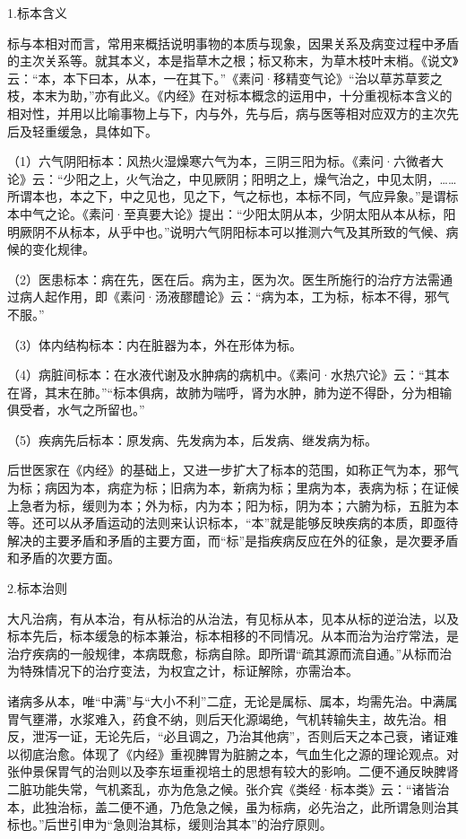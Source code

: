 \documentclass[draft,12pt]{ctexbook}
\begin{document}

1.标本含义

标与本相对而言，常用来概括说明事物的本质与现象，因果关系及病变过程中矛盾的主次关系等。就其本义，本是指草木之根；标又称末，为草木枝叶末梢。《说文》云：“本，本下曰本，从本，一在其下。”《素问·移精变气论》“治以草苏草荄之枝，本末为助，”亦有此义。《内经》在对标本概念的运用中，十分重视标本含义的相对性，并用以比喻事物上与下，内与外，先与后，病与医等相对应双方的主次先后及轻重缓急，具体如下。

（1）六气阴阳标本：风热火湿燥寒六气为本，三阴三阳为标。《素问·六微者大论》云：“少阳之上，火气治之，中见厥阴；阳明之上，燥气治之，中见太阴，……所谓本也，本之下，中之见也，见之下，气之标也，本标不同，气应异象。”是谓标本中气之论。《素问·至真要大论》提出：“少阳太阴从本，少阴太阳从本从标，阳明厥阴不从标本，从乎中也。”说明六气阴阳标本可以推测六气及其所致的气候、病候的变化规律。

（2）医患标本：病在先，医在后。病为主，医为次。医生所施行的治疗方法需通过病人起作用，即《素问·汤液醪醴论》云：“病为本，工为标，标本不得，邪气不服。”

（3）体内结构标本：内在脏器为本，外在形体为标。

（4）病脏间标本：在水液代谢及水肿病的病机中。《素问·水热穴论》云：“其本在肾，其末在肺。”“标本俱病，故肺为喘呼，肾为水肿，肺为逆不得卧，分为相输俱受者，水气之所留也。”

（5）疾病先后标本：原发病、先发病为本，后发病、继发病为标。

后世医家在《内经》的基础上，又进一步扩大了标本的范围，如称正气为本，邪气为标；病因为本，病症为标；旧病为本，新病为标；里病为本，表病为标；在证候上急者为标，缓则为本；外为标，内为本；阳为标，阴为本；六腑为标，五脏为本等。还可以从矛盾运动的法则来认识标本，“本”就是能够反映疾病的本质，即亟待解决的主要矛盾和矛盾的主要方面，而“标”是指疾病反应在外的征象，是次要矛盾和矛盾的次要方面。

2.标本治则

大凡治病，有从本治，有从标治的从治法，有见标从本，见本从标的逆治法，以及标本先后，标本缓急的标本兼治，标本相移的不同情况。从本而治为治疗常法，是治疗疾病的一般规律，本病既愈，标病自除。即所谓“疏其源而流自通。”从标而治为特殊情况下的治疗变法，为权宜之计，标证解除，亦需治本。

诸病多从本，唯“中满”与“大小不利”二症，无论是属标、属本，均需先治。中满属胃气壅滞，水浆难入，药食不纳，则后天化源竭绝，气机转输失主，故先治。相反，泄泻一证，无论先后，“必且调之，乃治其他病”，否则后天之本己衰，诸证难以彻底治愈。体现了《内经》重视脾胃为脏腑之本，气血生化之源的理论观点。对张仲景保胃气的治则以及李东垣重视培土的思想有较大的影响。二便不通反映脾肾二脏功能失常，气机紊乱，亦为危急之候。张介宾《类经·标本类》云：“诸皆治本，此独治标，盖二便不通，乃危急之候，虽为标病，必先治之，此所谓急则治其标也。”后世引申为“急则治其标，缓则治其本”的治疗原则。
\end{document}
